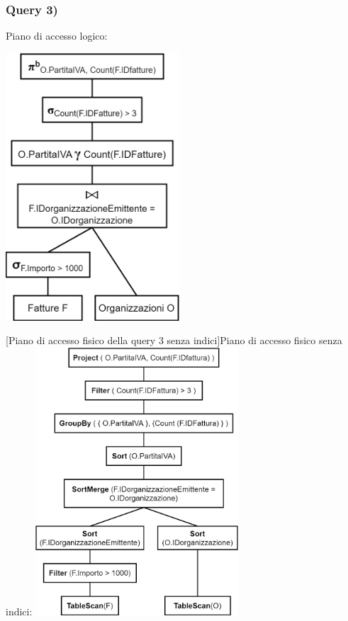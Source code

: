 \documentclass[a4paper,12pt]{article}
\begin{document}
 \subsubsection{ Query 3) }

\vspace{-0.3cm}\begin{minipage}{\textwidth}
\begin{multicols}{2}

\null \vfill
Piano di accesso logico:

\vspace{0.3cm}\includegraphics[height=10cm]{ Albero logico 3.png }
\vfill \null

\columnbreak

 [Piano di accesso fisico della query 3 senza indici]{Piano di accesso fisico senza indici:}
\includegraphics[height=10cm]{ Albero fisico 3.png }
\end{multicols}
\end{minipage}
\end{document}
